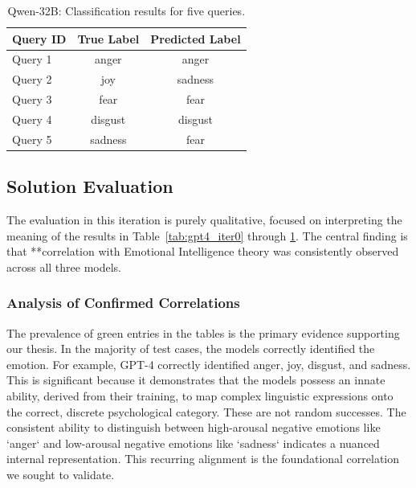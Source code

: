 \begin{table}[H]
\centering
\caption{Qwen-32B: Classification results for five queries.}
\begin{tabular}{lcc}
\toprule
\textbf{Query ID} & \textbf{True Label} & \textbf{Predicted Label} \\
\midrule
Query 1 & anger   & \textcolor{corrGreen}{anger} \\
Query 2 & joy     & \textcolor{corrRed}{sadness} \\
Query 3 & fear    & \textcolor{corrGreen}{fear} \\
Query 4 & disgust & \textcolor{corrGreen}{disgust} \\
Query 5 & sadness & \textcolor{corrRed}{fear} \\
\bottomrule
\end{tabular}
\label{tab:qwen_iter0}
\end{table}

\subsection{Solution Evaluation}
The evaluation in this iteration is purely qualitative, focused on interpreting the meaning of the results in Table~\ref{tab:gpt4_iter0} through \ref{tab:qwen_iter0}. The central finding is that **correlation with Emotional Intelligence theory was consistently observed across all three models.

\subsubsection{Analysis of Confirmed Correlations}
The prevalence of green entries in the tables is the primary evidence supporting our thesis. In the majority of test cases, the models correctly identified the emotion. For example, GPT-4 correctly identified anger, joy, disgust, and sadness. This is significant because it demonstrates that the models possess an innate ability, derived from their training, to map complex linguistic expressions onto the correct, discrete psychological category. These are not random successes. The consistent ability to distinguish between high-arousal negative emotions like `anger` and low-arousal negative emotions like `sadness` indicates a nuanced internal representation. This recurring alignment is the foundational correlation we sought to validate.

